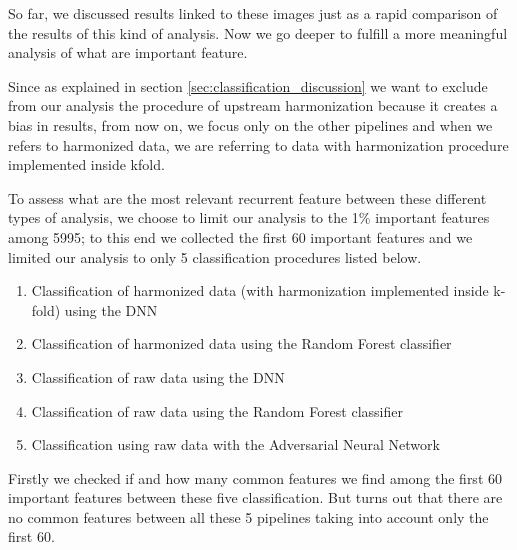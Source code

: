 \documentclass[10pt]{report}
\begin{document}
So far, we discussed results linked to these images just as a rapid comparison of the results of this kind of analysis. Now we go deeper to fulfill a more meaningful analysis of what are important feature.

Since as explained in section \ref{sec:classification_discussion} we want to exclude from our analysis the procedure of upstream harmonization because it creates a bias in results, from now on, we focus only on the other pipelines and when we refers to harmonized data, we are referring to data with harmonization procedure implemented inside kfold.

To assess what are the most relevant recurrent feature between these different types of analysis, we choose to limit our analysis to the 1\% important features among 5995; to this end we collected the first 60 important features and we limited our analysis to only 5 classification procedures listed below.


\begin{enumerate}
\item Classification of harmonized data (with harmonization implemented inside k-fold) using the DNN \label{proc:dnn_kfold}
\item Classification of harmonized data using the Random Forest classifier \label{proc:rf_kfold}
\item Classification of raw data using the DNN \label{proc:dnn_no}
\item Classification of raw data using the Random Forest classifier \label{proc:rf_no}
\item Classification using raw data with the Adversarial Neural Network \label{proc:adv}
\end{enumerate}



Firstly we checked if and how many common features we find among the first 60 important features between these five classification.
But turns out that there are no common features between all these 5 pipelines taking into account only the first 60.
\end{document}
